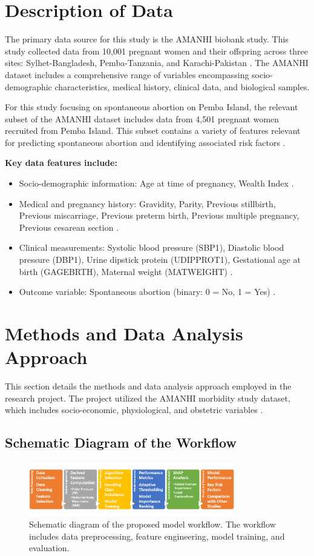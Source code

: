 \documentclass{article}
\begin{document}
\section{Description of Data}
The primary data source for this study is the AMANHI biobank study. This study collected data from 10,001 pregnant women and their offspring across three sites: Sylhet-Bangladesh, Pemba-Tanzania, and Karachi-Pakistan \cite{aftab2021}. The AMANHI dataset includes a comprehensive range of variables encompassing socio-demographic characteristics, medical history, clinical data, and biological samples.

For this study focusing on spontaneous abortion on Pemba Island, the relevant subset of the AMANHI dataset includes data from 4,501 pregnant women recruited from Pemba Island. This subset contains a variety of features relevant for predicting spontaneous abortion and identifying associated risk factors \cite{aljameel2023}.

\textbf{Key data features include:}
\begin{itemize}
    \item Socio-demographic information: Age at time of pregnancy, Wealth Index \cite{aftab2021}.
    \item Medical and pregnancy history: Gravidity, Parity, Previous stillbirth, Previous miscarriage, Previous preterm birth, Previous multiple pregnancy, Previous cesarean section \cite{wu2024}.
    \item Clinical measurements: Systolic blood pressure (SBP1), Diastolic blood pressure (DBP1), Urine dipstick protein (UDIPPROT1), Gestational age at birth (GAGEBRTH), Maternal weight (MATWEIGHT) \cite{setegn2024}.
    \item Outcome variable: Spontaneous abortion (binary: 0 = No, 1 = Yes) \cite{aljameel2023}.
\end{itemize}

\section{Methods and Data Analysis Approach}
This section details the methods and data analysis approach employed in the research project. The project utilized the AMANHI morbidity study dataset, which includes socio-economic, physiological, and obstetric variables \cite{aftab2021}.

\subsection{Schematic Diagram of the Workflow}
\begin{figure}[h]
    \centering
    \includegraphics[width=0.8\textwidth]{schematic diagram.png}
    \caption{Schematic diagram of the proposed model workflow. The workflow includes data preprocessing, feature engineering, model training, and evaluation.}
    \label{fig:schematic}
\end{figure}
\end{document}
